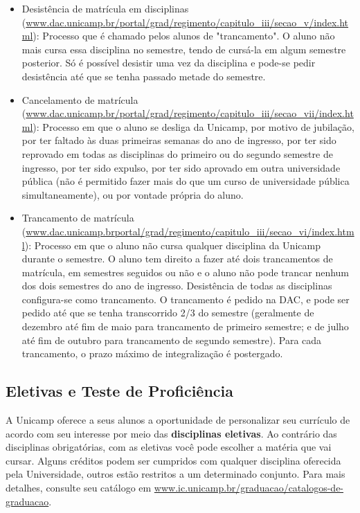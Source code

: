\begin{itemize}
\item Desistência de matrícula em disciplinas
      (\url{www.dac.unicamp.br/portal/grad/regimento/capitulo_iii/secao_v/index.html}):
      Processo que é chamado pelos alunos de "trancamento".
      O aluno não mais cursa essa disciplina no semestre,
      tendo de cursá-la em algum semestre posterior. Só é possível desistir uma vez da
      disciplina e pode-se pedir desistência até que se tenha passado metade do
      semestre.
\item Cancelamento de matrícula
      (\url{www.dac.unicamp.br/portal/grad/regimento/capitulo_iii/secao_vii/index.html}):
      Processo em que o aluno se desliga da Unicamp, por motivo de jubilação, por
      ter faltado às duas primeiras semanas do ano de ingresso, por ter sido
      reprovado em todas as disciplinas do primeiro ou do segundo semestre de
      ingresso, por ter sido expulso, por ter sido aprovado em outra universidade
      pública (não é permitido fazer mais do que um curso de universidade pública
      simultaneamente), ou por vontade própria do aluno.
\item Trancamento de matrícula
      (\url{www.dac.unicamp.brportal/grad/regimento/capitulo_iii/secao_vi/index.html}):
      Processo em que o aluno não cursa qualquer disciplina da Unicamp durante
      o semestre. O aluno tem direito a fazer até dois trancamentos de matrícula, em
      semestres seguidos ou não e o aluno não pode trancar nenhum dos dois
      semestres do ano de ingresso. Desistência de todas as disciplinas
      configura-se como trancamento. O trancamento é pedido na DAC, e pode ser
      pedido até que se tenha transcorrido 2/3 do semestre (geralmente de dezembro
      até fim de maio para trancamento de primeiro semestre; e de julho até fim de
      outubro para trancamento de segundo semestre). Para cada trancamento,
      o prazo máximo de integralização é postergado.
\end{itemize}

\subsection{Eletivas e Teste de Proficiência}

A Unicamp oferece a seus alunos a oportunidade de personalizar seu currículo de
acordo com seu interesse por meio das \textbf{disciplinas eletivas}. Ao contrário das
disciplinas obrigatórias, com as eletivas você pode escolher a matéria que vai cursar. Alguns
créditos podem ser cumpridos com qualquer disciplina oferecida pela
Universidade, outros estão restritos a um determinado conjunto. Para mais
detalhes, consulte seu catálogo em
\url{www.ic.unicamp.br/graduacao/catalogos-de-graduacao}.

